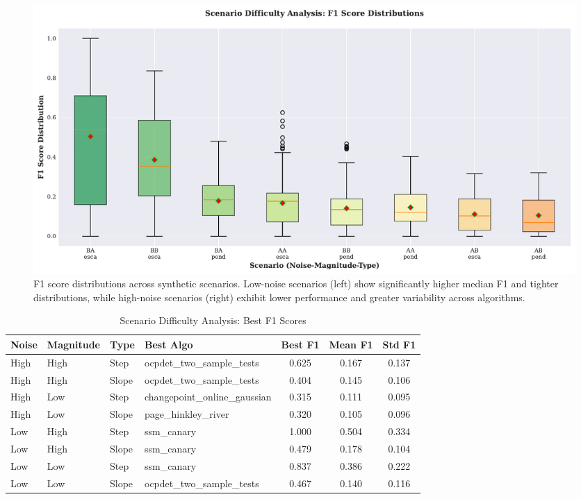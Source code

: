 \documentclass[journal,article,submit,pdftex,moreauthors]{Definitions/mdpi}
\begin{document}
\begin{figure}[ht]
\centering
\includegraphics[width=\textwidth]{figures/fig_scenario_difficulty.pdf}
\caption{F1 score distributions across synthetic scenarios. Low-noise scenarios (left) show significantly higher median F1 and tighter distributions, while high-noise scenarios (right) exhibit lower performance and greater variability across algorithms.}
\label{fig:scenario_difficulty}
\end{figure}

\begin{table}[ht]
\centering
\caption{Scenario Difficulty Analysis: Best F1 Scores}
\label{tab:scenario_matrix}
\small
\begin{tabular}{llllccc}
\toprule
\textbf{Noise} & \textbf{Magnitude} & \textbf{Type} & \textbf{Best Algo} & \textbf{Best F1} & \textbf{Mean F1} & \textbf{Std F1} \\
\midrule
High & High & Step & ocpdet\_two\_sample\_tests & 0.625 & 0.167 & 0.137 \\
High & High & Slope & ocpdet\_two\_sample\_tests & 0.404 & 0.145 & 0.106 \\
High & Low & Step & changepoint\_online\_gaussian & 0.315 & 0.111 & 0.095 \\
High & Low & Slope & page\_hinkley\_river & 0.320 & 0.105 & 0.096 \\
Low & High & Step & ssm\_canary & 1.000 & 0.504 & 0.334 \\
Low & High & Slope & ssm\_canary & 0.479 & 0.178 & 0.104 \\
Low & Low & Step & ssm\_canary & 0.837 & 0.386 & 0.222 \\
Low & Low & Slope & ocpdet\_two\_sample\_tests & 0.467 & 0.140 & 0.116 \\
\bottomrule
\end{tabular}
\end{table}
\end{document}

